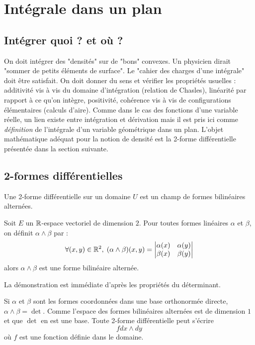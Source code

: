 \section{Intégrale dans un plan}
\subsection{Intégrer quoi ? et où ?}
On doit intégrer des "densités" sur de "bons" convexes. Un physicien dirait "sommer de petits éléments de surface".  Le "cahier des charges d'une intégrale" doit être satisfait. On doit donner du sens et vérifier les propriétés usuelles : additivité vis à vis du domaine d'intégration (relation de Chasles), linéarité par rapport à ce qu'on intègre, positivité, cohérence vis à vis de configurations élémentaires (calculs d'aire). Comme dans le cas des fonctions d'une variable réelle, un lien existe entre intégration et dérivation mais il est pris ici comme \emph{définition} de l'intégrale d'un variable géométrique dans un plan.\newline
L'objet mathématique adéquat pour la notion de densité est la 2-forme différentielle présentée dans la section suivante. 
\subsection{2-formes différentielles}
\begin{defi}
 Une 2-forme différentielle sur un domaine $U$ est un champ de formes bilinéaires alternées.
\end{defi}
\begin{propdef}
 Soit $E$ un $\mathbb{R}$-espace vectoriel de dimension $2$. Pour toutes formes linéaires $\alpha$ et $\beta$, on définit $\alpha\wedge \beta$ par :
\begin{displaymath}
 \forall(x,y)\in \mathbb{R}^2,\; (\alpha\wedge \beta)(x,y)=
\begin{vmatrix}
 \alpha(x)&\alpha(y)\\ \beta(x) & \beta(y)
\end{vmatrix}
\end{displaymath}
alors $\alpha\wedge \beta$ est une forme bilinéaire alternée.
\end{propdef}
\begin{demo}
 La démonstration est immédiate d'après les propriétés du déterminant.
\end{demo}
Si $\alpha$ et $\beta$ sont les formes coordonnées dans une base orthonormée directe, $\alpha\wedge \beta=\det$. Comme l'espace des formes bilinéaires alternées est de dimension $1$ et que $\det$ en est une base. Toute 2-forme différentielle peut s'écrire
\begin{displaymath}
 fdx\wedge dy
\end{displaymath}
où $f$ est une fonction définie dans le domaine.
